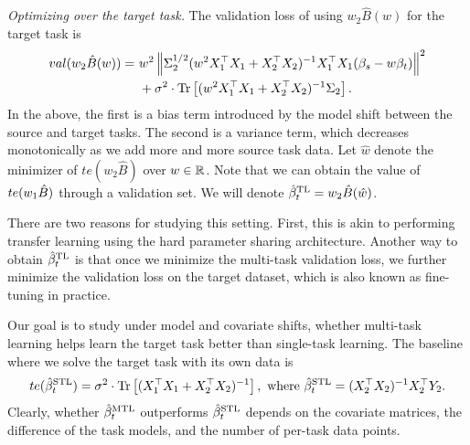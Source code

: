 \medskip
\noindent\textit{Optimizing over the target task.} The validation loss of using $w_2 \hat{B}(w)$ for the target task is
\begin{align}
	val(w_2\hat{B}(w)) =&~ w^2 \left\| \Sigma_2^{1/2}(w^2 X_1^{\top}X_1 + X_2^{\top}X_2)^{-1} X_1^{\top}X_1 (\beta_s - w \beta_t) \right\|^2 \nonumber \\
			&~ + \sigma^2 \cdot \operatorname{Tr}\left[(w^2 X_1^{\top}X_1 + X_2^{\top}X_2)^{-1} \Sigma_2\right]. \label{eq_te_mtl}
\end{align}
In the above, the first is a bias term introduced by the model shift between the source and target tasks.
The second is a variance term, which decreases monotonically as we add more and more source task data.
Let $\hat{w}$ denote the minimizer of $te(w_2 \hat{B})$ over $w\in\mathbb{R}$.
Note that we can obtain the value of $te(w_1\hat{B})$ through a validation set.
We will denote $\hat{\beta}_t^{\text{TL}} = w_2 \hat{B}(\hat{w})$.

There are two reasons for studying this setting.
First, this is akin to performing transfer learning using the hard parameter sharing architecture.
Another way to obtain $\hat{\beta}_t^{\text{TL}}$ is that once we minimize the multi-task validation loss, we further minimize the validation loss on the target dataset, which is also known as fine-tuning in practice.

Our goal is to study under model and covariate shifts, whether multi-task learning helps learn the target task better than single-task learning.
The baseline where we solve the target task with its own data is
\begin{align*}
	te(\hat{\beta}_t^{\text{STL}}) = \sigma^2 \cdot \operatorname{Tr}\left[(X_1^{\top}X_1 + X_2^{\top}X_2)^{-1}\right], \text{ where } \hat{\beta}_t^{\text{STL}} = (X_2^{\top}X_2)^{-1} X_2^{\top}Y_2.
\end{align*}
Clearly, whether $\hat{\beta}_t^{\text{MTL}}$ outperforms $\hat{\beta}_t^{\text{STL}}$ depends on the covariate matrices, the difference of the task models, and the number of per-task data points.
